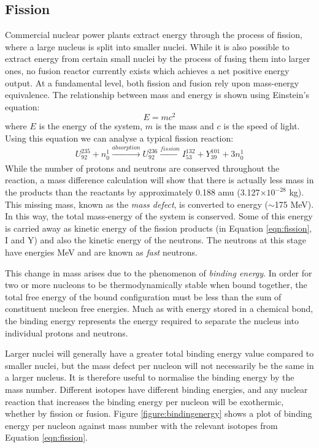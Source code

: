 \subsection{Fission}

Commercial nuclear power plants extract energy through the process of fission, where a large nucleus is split into smaller nuclei. While it is also possible to extract energy from certain small nuclei by the process of fusing them into larger ones, no fusion reactor currently exists which achieves a net positive energy output. At a fundamental level, both fission and fusion rely upon mass-energy equivalence. The relationship between mass and energy is shown using Einstein's equation:
\begin{equation}
\label{emc2}
    E = mc^{2}
\end{equation}
where $E$ is the energy of the system, $m$ is the mass and $c$ is the speed of light. Using this equation we can analyse a typical fission reaction:
\begin{equation}
    U^{235}_{92} + n^{1}_{0} \xrightarrow[]{absorption} U^{236}_{92} \xrightarrow[]{fission} I^{132}_{53} + Y^{101}_{39} + 3n^{1}_{0}
\label{eqn:fission} 
\end{equation}
While the number of protons and neutrons are conserved throughout the reaction, a mass difference calculation will show that there is actually less mass in the products than the reactants by approximately 0.188 amu (3.127$\times 10^{-28}$ kg). This missing mass, known as the \emph{mass defect}, is converted to energy ($\sim$175 MeV). In this way, the total mass-energy of the system is conserved. Some of this energy is carried away as kinetic energy of the fission products (in Equation \ref{eqn:fission}, I and Y) and also the kinetic energy of the neutrons. The neutrons at this stage have energies  MeV and are known as \emph{fast} neutrons.

This change in mass arises due to the phenomenon of \emph{binding energy}. In order for two or more nucleons to be thermodynamically stable when bound together, the total free energy of the bound configuration must be less than the sum of constituent nucleon free energies. Much as with energy stored in a chemical bond, the binding energy represents the energy required to separate the nucleus into individual protons and neutrons. 

Larger nuclei will generally have a greater total binding energy value compared to smaller nuclei, but the mass defect per nucleon will not necessarily be the same in a larger nucleus. It is therefore useful to normalise the binding energy by the mass number. Different isotopes have different binding energies, and any nuclear reaction that increases the binding energy per nucleon will be exothermic, whether by fission or fusion. Figure \ref{figure:bindingenergy} shows a plot of binding energy per nucleon against mass number with the relevant isotopes from Equation \ref{eqn:fission}. 

